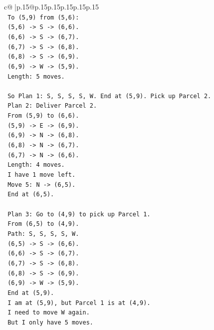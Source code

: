 \documentclass{article}
\begin{document}
{\begin{supertabular}{c@{$\;$}|p{.15\linewidth}@{}p{.15\linewidth}p{.15\linewidth}p{.15\linewidth}p{.15\linewidth}p{.15\linewidth}}
{{{\\ 
\texttt{      To (5,9) from (5,6):} \\
\texttt{      (5,6) {-}> S {-}> (6,6).} \\
\texttt{      (6,6) {-}> S {-}> (6,7).} \\
\texttt{      (6,7) {-}> S {-}> (6,8).} \\
\texttt{      (6,8) {-}> S {-}> (6,9).} \\
\texttt{      (6,9) {-}> W {-}> (5,9).} \\
\texttt{      Length: 5 moves.} \\
\\ 
\texttt{      So Plan 1: S, S, S, S, W. End at (5,9). Pick up Parcel 2.} \\
\texttt{      Plan 2: Deliver Parcel 2.} \\
\texttt{      From (5,9) to (6,6).} \\
\texttt{      (5,9) {-}> E {-}> (6,9).} \\
\texttt{      (6,9) {-}> N {-}> (6,8).} \\
\texttt{      (6,8) {-}> N {-}> (6,7).} \\
\texttt{      (6,7) {-}> N {-}> (6,6).} \\
\texttt{      Length: 4 moves.} \\
\texttt{      I have 1 move left.} \\
\texttt{      Move 5: N {-}> (6,5).} \\
\texttt{      End at (6,5).} \\
\\ 
\texttt{      Plan 3: Go to (4,9) to pick up Parcel 1.} \\
\texttt{      From (6,5) to (4,9).} \\
\texttt{      Path: S, S, S, S, W.} \\
\texttt{      (6,5) {-}> S {-}> (6,6).} \\
\texttt{      (6,6) {-}> S {-}> (6,7).} \\
\texttt{      (6,7) {-}> S {-}> (6,8).} \\
\texttt{      (6,8) {-}> S {-}> (6,9).} \\
\texttt{      (6,9) {-}> W {-}> (5,9).} \\
\texttt{      End at (5,9).} \\
\texttt{      I am at (5,9), but Parcel 1 is at (4,9).} \\
\texttt{      I need to move W again.} \\
\texttt{      But I only have 5 moves.} \\
}}}
\end{supertabular}}
\end{document}
